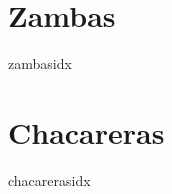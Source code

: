 \documentclass[10pt, openany]{book}
\title{\booktitle}
\author{\authorname}
\begin{document}
    \frontmatter
    \tableofcontents 
    
    
    \mainmatter
    \pagestyle{fancy}  

	\chapter{Zambas}
	 \newpage
	
	\begin{songs}{zambasidx}
		
			
		
	\end{songs}
	
	\chapter{Chacareras}
	\newpage
	
	\begin{songs}{chacarerasidx}

		
		
		
		
		
		
	\end{songs}
	
	
	
	
\end{document}

